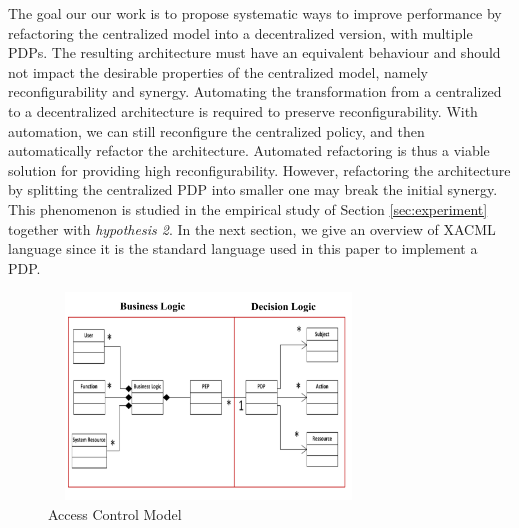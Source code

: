 The goal our our work is to propose systematic ways to improve performance by refactoring the centralized model into a decentralized version, with multiple PDPs. The resulting
 architecture must have an equivalent behaviour and should not impact the desirable properties of the centralized model, namely reconfigurability and synergy. 
Automating the transformation from a centralized to a decentralized architecture is required to preserve reconfigurability. With automation, we can still reconfigure the centralized policy, 
and then automatically refactor the architecture. Automated refactoring is thus a viable solution for providing high reconfigurability.  
However, refactoring the architecture by splitting the centralized PDP into smaller one may break the initial synergy. This phenomenon is studied in the empirical study of Section 
\ref{sec:experiment} together with \textit{hypothesis 2}. In the next section, we give an overview of XACML language since it is the standard language used in this paper to implement a PDP.


\begin{figure}[!h]
\begin{center}
\includegraphics[height=5.5cm,width=8.5cm]{model}
\caption{Access Control Model}
\label{model}
\end{center}
\end{figure}

